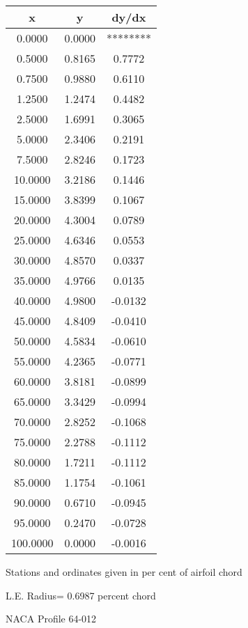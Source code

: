 \documentclass[11pt]{book}
\begin{document}
 \vspace{8mm}
 \begin{tabular}{|c|c|c|} \hline 
  x  &  y  &  dy/dx \\
 \hline
0.0000 & 0.0000 & ******** \\
0.5000 & 0.8165 & 0.7772 \\
0.7500 & 0.9880 & 0.6110 \\
1.2500 & 1.2474 & 0.4482 \\
2.5000 & 1.6991 & 0.3065 \\
5.0000 & 2.3406 & 0.2191 \\
7.5000 & 2.8246 & 0.1723 \\
10.0000 & 3.2186 & 0.1446 \\
15.0000 & 3.8399 & 0.1067 \\
20.0000 & 4.3004 & 0.0789 \\
25.0000 & 4.6346 & 0.0553 \\
30.0000 & 4.8570 & 0.0337 \\
35.0000 & 4.9766 & 0.0135 \\
40.0000 & 4.9800 & -0.0132 \\
45.0000 & 4.8409 & -0.0410 \\
50.0000 & 4.5834 & -0.0610 \\
55.0000 & 4.2365 & -0.0771 \\
60.0000 & 3.8181 & -0.0899 \\
65.0000 & 3.3429 & -0.0994 \\
70.0000 & 2.8252 & -0.1068 \\
75.0000 & 2.2788 & -0.1112 \\
80.0000 & 1.7211 & -0.1112 \\
85.0000 & 1.1754 & -0.1061 \\
90.0000 & 0.6710 & -0.0945 \\
95.0000 & 0.2470 & -0.0728 \\
100.0000 & 0.0000 & -0.0016 \\
 \hline
 \end{tabular}
 \vspace{8mm}


Stations and ordinates given in per cent of airfoil chord 


L.E. Radius=  0.6987 percent chord
 \newpage
  \label{p64-012}
 \begin{Large}
 NACA Profile 64-012
 \end{Large}
  
\end{document}
